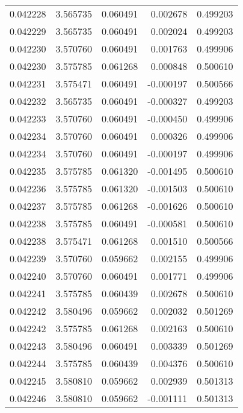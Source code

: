 \begin{tabular}{lrrrr}
0.042228    &  3.565735 &  0.060491 &  0.002678 &             0.499203 \\
0.042229    &  3.565735 &  0.060491 &  0.002024 &             0.499203 \\
0.042230    &  3.570760 &  0.060491 &  0.001763 &             0.499906 \\
0.042230    &  3.575785 &  0.061268 &  0.000848 &             0.500610 \\
0.042231    &  3.575471 &  0.060491 & -0.000197 &             0.500566 \\
0.042232    &  3.565735 &  0.060491 & -0.000327 &             0.499203 \\
0.042233    &  3.570760 &  0.060491 & -0.000450 &             0.499906 \\
0.042234    &  3.570760 &  0.060491 &  0.000326 &             0.499906 \\
0.042234    &  3.570760 &  0.060491 & -0.000197 &             0.499906 \\
0.042235    &  3.575785 &  0.061320 & -0.001495 &             0.500610 \\
0.042236    &  3.575785 &  0.061320 & -0.001503 &             0.500610 \\
0.042237    &  3.575785 &  0.061268 & -0.001626 &             0.500610 \\
0.042238    &  3.575785 &  0.060491 & -0.000581 &             0.500610 \\
0.042238    &  3.575471 &  0.061268 &  0.001510 &             0.500566 \\
0.042239    &  3.570760 &  0.059662 &  0.002155 &             0.499906 \\
0.042240    &  3.570760 &  0.060491 &  0.001771 &             0.499906 \\
0.042241    &  3.575785 &  0.060439 &  0.002678 &             0.500610 \\
0.042242    &  3.580496 &  0.059662 &  0.002032 &             0.501269 \\
0.042242    &  3.575785 &  0.061268 &  0.002163 &             0.500610 \\
0.042243    &  3.580496 &  0.060491 &  0.003339 &             0.501269 \\
0.042244    &  3.575785 &  0.060439 &  0.004376 &             0.500610 \\
0.042245    &  3.580810 &  0.059662 &  0.002939 &             0.501313 \\
0.042246    &  3.580810 &  0.059662 & -0.001111 &             0.501313 \\

\end{tabular}
